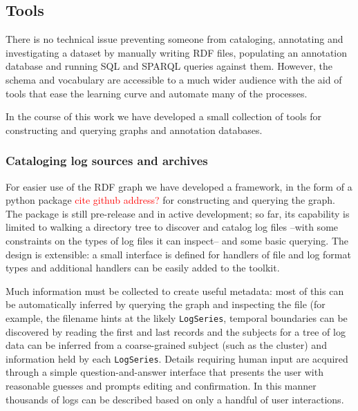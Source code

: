 \subsection{Tools}

There is no technical issue preventing someone from cataloging, 
annotating and investigating a dataset 
by manually writing RDF files, populating an annotation database 
and running SQL and SPARQL queries against them. However, 
the schema and vocabulary are accessible to a much wider 
audience with the aid of tools that ease the learning curve and automate many of the processes.

In the course of this work we have developed a small collection 
of tools for constructing and querying graphs and annotation databases.

%

\subsubsection{Cataloging log sources and archives}

For easier use of the RDF graph we have developed a framework, in 
the form of a python package \textcolor{red}{cite github address?}
for constructing and querying the graph. The package is still pre-release
and in active development; so far, its capability is limited to 
walking a directory tree to discover and catalog log files --with 
some constraints on the types of log files it can inspect-- and some 
basic querying. The design is extensible: a small interface
is defined for handlers of file and log format types and additional 
handlers can be easily added to the toolkit.

Much information must be collected to create useful metadata: most of
this can be automatically inferred by querying the graph and inspecting 
the file (for example, the filename hints at the likely \texttt{LogSeries},
temporal boundaries can be discovered by reading the first and last records
and the subjects for a tree of log data can be inferred from a coarse-grained subject (such as the cluster) and information held by each \texttt{LogSeries}. Details requiring human input are acquired through 
a simple question-and-answer interface that presents the user with 
reasonable guesses and prompts editing and confirmation. In this manner 
thousands of logs can be described based on only a handful of user 
interactions.


